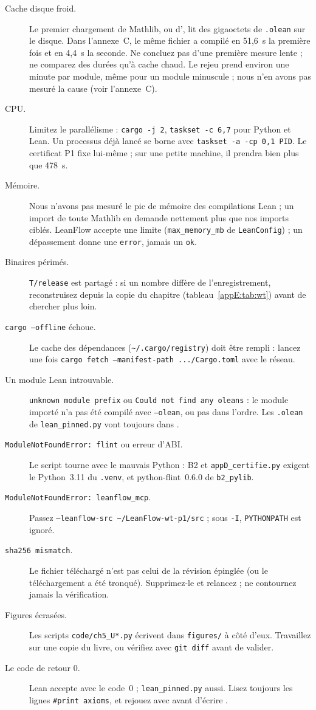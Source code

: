 \begin{description}
\item[Cache disque froid.] Le premier chargement de Mathlib, ou d', lit des gigaoctets de
\texttt{.olean} sur le disque. Dans l'annexe~C, le même fichier a compilé en 51,6~s la première fois et en 4,4~s la
seconde. Ne concluez pas d'une première mesure lente ; ne comparez des durées qu'à cache chaud. Le rejeu
 prend environ une minute par module, même pour un module minuscule ; nous n'en avons pas mesuré la cause (voir l'annexe~C).
\item[CPU.] Limitez le parallélisme : \texttt{cargo -j 2}, \texttt{taskset -c 6,7} pour Python et Lean. Un processus déjà
lancé se borne avec \texttt{taskset -a -cp 0,1 PID}. Le certificat P1 fixe lui-même  ; sur
une petite machine, il prendra bien plus que 478~s.
\item[Mémoire.] Nous n'avons pas mesuré le pic de mémoire des compilations Lean ; un import de toute Mathlib en demande
nettement plus que nos imports ciblés. LeanFlow accepte une limite (\texttt{max\_memory\_mb} de \texttt{LeanConfig}) ; un
dépassement donne une \texttt{error}, jamais un \texttt{ok}.
\item[Binaires périmés.] \texttt{T/release} est partagé : si un nombre diffère de l'enregistrement, reconstruisez depuis
la copie du chapitre (tableau~\ref{appE:tab:wt}) avant de chercher plus loin.
\item[\texttt{cargo --offline} échoue.] Le cache des dépendances (\texttt{\~{}/.cargo/registry}) doit être rempli : lancez
une fois \texttt{cargo fetch --manifest-path .../Cargo.toml} avec le réseau.
\item[Un module Lean introuvable.] \texttt{unknown module prefix} ou \texttt{Could not find any oleans} : le module importé
n'a pas été compilé avec \texttt{--olean}, ou pas dans l'ordre. Les \texttt{.olean} de \texttt{lean\_pinned.py} vont
toujours dans .
\item[\texttt{ModuleNotFoundError: flint} ou erreur d'ABI.] Le script tourne avec le mauvais Python : B2 et
\texttt{appD\_certifie.py} exigent le Python~3.11 du \texttt{.venv}, et python-flint~0.6.0 de \texttt{b2\_pylib}.
\item[\texttt{ModuleNotFoundError: leanflow\_mcp}.] Passez \texttt{--leanflow-src \~{}/LeanFlow-wt-p1/src} ; sous
\texttt{-I}, \texttt{PYTHONPATH} est ignoré.
\item[\texttt{sha256 mismatch}.] Le fichier téléchargé n'est pas celui de la révision épinglée (ou le téléchargement a été
tronqué). Supprimez-le et relancez ; ne contournez jamais la vérification.
\item[Figures écrasées.] Les scripts \texttt{code/ch5\_U*.py} écrivent dans \texttt{figures/} à côté d'eux. Travaillez sur une
copie du livre, ou vérifiez avec \texttt{git diff} avant de valider.
\item[Le code de retour 0.] Lean accepte  avec le code~$0$ ; \texttt{lean\_pinned.py}
aussi. Lisez toujours les lignes \texttt{\#print axioms}, et rejouez avec  avant d'écrire \tierA.
\end{description}
